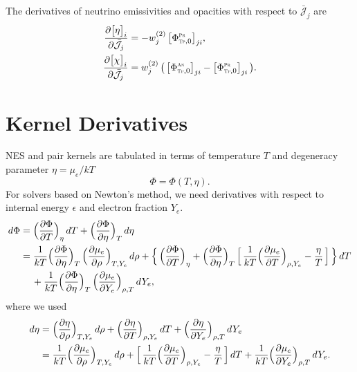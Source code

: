 \documentclass[12pt]{article}
\newcommand{\PROD}{\mbox{\tiny{\sc Pr}}}
\newcommand{\ANN}{\mbox{\tiny{\sc An}}}
\newcommand{\TP}{\mbox{\tiny{\sc Tp}}}      %
\begin{document}
The derivatives of neutrino emissivities and opacities with respect to $\bar{\mathcal{J}}_{j}$ are
\begin{align}
  \pderiv{\big[\eta\big]_{i}}{\bar{\mathcal{J}}_{j}}
  &=-w_{j}^{(2)}\,\big[\Phi_{\TP,0}^{\PROD}\big]_{ji} , \\
  \pderiv{\big[\chi\big]_{i}}{\bar{\mathcal{J}}_{j}}
  &=w_{j}^{(2)}\,\big(\,\big[\Phi_{\TP,0}^{\ANN}\big]_{ji}-\big[\Phi_{\TP,0}^{\PROD}\big]_{ji}\,\big) .
\end{align}




\appendix

\section{Kernel Derivatives}

NES and pair kernels are tabulated in terms of temperature $T$ and degeneracy parameter $\eta=\mu_{e}/kT$
\begin{equation}
  \Phi=\Phi(T,\eta).  
\end{equation}
For solvers based on Newton's method, we need derivatives with respect to internal energy $\epsilon$ and electron fraction $Y_{e}$.  
\begin{align}
  d\Phi 
  &= \Big(\frac{\partial \Phi}{\partial T}\Big)_{\eta}\,dT+\Big(\frac{\partial \Phi}{\partial \eta}\Big)_{T}\,d\eta \nonumber \\
  &=\frac{1}{kT}\Big(\frac{\partial \Phi}{\partial \eta}\Big)_{T}\,\Big(\frac{\partial \mu_{e}}{\partial \rho}\Big)_{T,Y_{e}}\,d\rho
  +\Big\{\,\Big(\frac{\partial \Phi}{\partial T}\Big)_{\eta} + \Big(\frac{\partial \Phi}{\partial \eta}\Big)_{T}\,\Big[\,\frac{1}{kT}\Big(\frac{\partial \mu_{e}}{\partial T}\Big)_{\rho,Y_{e}}-\frac{\eta}{T}\,\Big]\,\Big\}\,dT \nonumber \\
  &\hspace{12pt}
  +\frac{1}{kT}\Big(\frac{\partial \Phi}{\partial \eta}\Big)_{T}\,\Big(\frac{\partial \mu_{e}}{\partial Y_{e}}\Big)_{\rho,T}\,dY_{e},
  \label{eq:variation_T_Eta}
\end{align}
where we used
\begin{align}
  d\eta &= \Big(\frac{\partial \eta}{\partial \rho}\Big)_{T,Y_{e}}\,d\rho+\Big(\frac{\partial \eta}{\partial T}\Big)_{\rho,Y_{e}}\,dT+\Big(\frac{\partial \eta}{\partial Y_{e}}\Big)_{\rho,T}\,dY_{e} \nonumber \\
  &=\frac{1}{kT}\Big(\frac{\partial \mu_{e}}{\partial \rho}\Big)_{T,Y_{e}}\,d\rho 
  + \Big[\,\frac{1}{kT}\Big(\frac{\partial \mu_{e}}{\partial T}\Big)_{\rho,Y_{e}}-\frac{\eta}{T}\,\Big]\,dT + \frac{1}{kT}\Big(\frac{\partial \mu_{e}}{\partial Y_{e}}\Big)_{\rho,T}\,dY_{e}.  
\end{align}
\end{document}
